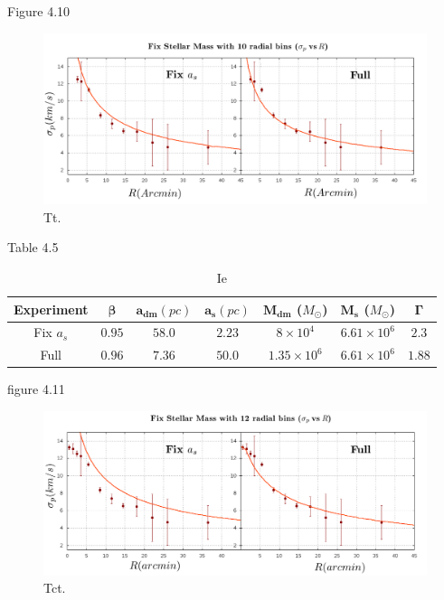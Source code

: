 Figure 4.10

\begin{figure}[H]
\centering
\includegraphics[width=15cm]{images/Starlight_1.png}
\caption[En]{Tt.}
\end{figure}

Table 4.5

\begin{table}[H]
\begin{center}
\begin{tabular}{| c| c| c| c| c| c| c|}
    \hline
    \textbf{Experiment} & $\mathbf{\beta}$ & $\mathbf{a_{dm}} (pc)$ & $\mathbf{a_{s}} (pc)$ & $\mathbf{M_{dm}}$ ($M_{\odot}$) & $\mathbf{M_{s}}$ ($M_{\odot}$) & $\mathbf{\Gamma}$\\ \hline
	Fix $a_s$ &	$0.95$ &	$58.0$ &	$2.23$ &	$8 \times 10^{4}$ &	$6.61 \times 10 ^{6}$ &	$2.3$\\ \hline
	Full &	$0.96$ &	$7.36$ &	$50.0$ &	$1.35 \times 10^{6}$ &	$6.61 \times 10^{6}$ &	$1.88$\\ \hline
  \end{tabular} 
\caption[It]{Ie}
\end{center}
  
\end{table}

figure 4.11

\begin{figure}[H]
\centering
\includegraphics[width=15cm]{images/Starlight_2.png}
\caption[En]{Tct.}
\end{figure}

